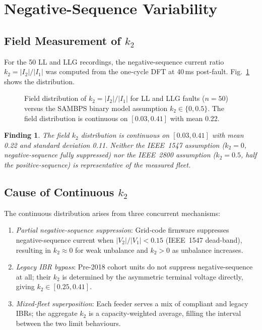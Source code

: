 \documentclass[journal]{IEEEtran}
\newtheorem{finding}{Finding}
\newcommand{\ktwo}{k_2}
\begin{document}
\section{Negative-Sequence Variability}
\label{sec:negseq}

\subsection{Field Measurement of $k_2$}

For the 50 LL and LLG recordings, the negative-sequence current ratio
$\ktwo = |I_2|/|I_1|$ was computed from the one-cycle DFT at 40\,ms
post-fault.  Fig.~\ref{fig:negseq} shows the distribution.

\begin{figure}[htbp]
  \centering
  
  \caption{Field distribution of $\ktwo = |I_2|/|I_1|$ for LL and LLG
           faults ($n = 50$) versus the SAMBPS binary model assumption
           $\ktwo \in \{0, 0.5\}$.  The field distribution is continuous
           on $[0.03, 0.41]$ with mean 0.22.}
  \label{fig:negseq}
\end{figure}

\begin{finding}
The field $\ktwo$ distribution is continuous on $[0.03, 0.41]$ with
mean 0.22 and standard deviation 0.11.  Neither the IEEE~1547
assumption ($\ktwo = 0$, negative-sequence fully suppressed) nor the
IEEE~2800 assumption ($\ktwo = 0.5$, half the positive-sequence) is
representative of the measured fleet.
\end{finding}

\subsection{Cause of Continuous $k_2$}

The continuous distribution arises from three concurrent mechanisms:
\begin{enumerate}
  \item \emph{Partial negative-sequence suppression}: Grid-code firmware
        suppresses negative-sequence current when $|V_2|/|V_1| < 0.15$
        (IEEE~1547 dead-band), resulting in $\ktwo \approx 0$ for weak
        unbalance and $\ktwo > 0$ as unbalance increases.
  \item \emph{Legacy IBR bypass}: Pre-2018 cohort units do not suppress
        negative-sequence at all; their $\ktwo$ is determined by the
        asymmetric terminal voltage directly, giving $\ktwo \in [0.25, 0.41]$.
  \item \emph{Mixed-fleet superposition}: Each feeder serves a mix of
        compliant and legacy IBRs; the aggregate $\ktwo$ is a capacity-weighted
        average, filling the interval between the two limit behaviours.
\end{enumerate}
\end{document}
